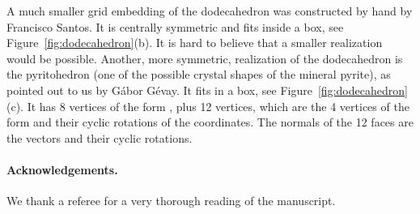 \documentclass{article}
\theoremstyle{plain} \newtheorem{thm}{Theorem}[section]
\begin{document}
A much smaller grid embedding of the dodecahedron was constructed by hand by
Francisco Santos.
It is centrally symmetric and fits inside a 
box, see Figure~\ref{fig:dodecahedron}(b).
It is hard to believe that a smaller realization would be possible.
Another, more symmetric, realization of the dodecahedron is the
pyritohedron (one of the possible crystal shapes of the mineral
pyrite), as pointed out to us by G\'abor G\'evay.  It fits in a
 box, see Figure~\ref{fig:dodecahedron}(c).  It has 8 vertices of the form
, plus 12 vertices, which are the 4 vertices of the form
 and their cyclic rotations of the coordinates.  The
normals of the 12 faces are the vectors  and their
cyclic rotations.

\paragraph{
Acknowledgements.}
We thank a referee for a very thorough reading of the manuscript.



\end{document}
